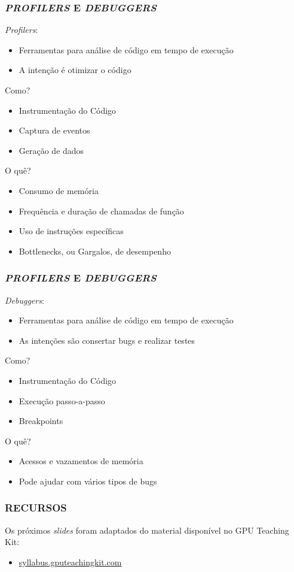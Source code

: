 \documentclass[10pt, compress]{beamer}
\begin{document}
\begin{frame}
    \frametitle{\textit{PROFILERS} E \textit{DEBUGGERS}}
    \textit{Profilers}:
    \begin{itemize}
        \item Ferramentas para análise de código \alert{em tempo de execução}
        \item A intenção é \alert{otimizar o código}
    \end{itemize}
    \pause
    Como?
    \begin{itemize}
        \item Instrumentação do Código
        \item Captura de eventos
        \item Geração de dados
    \end{itemize}
    \pause
    O quê?
    \begin{itemize}
        \item Consumo de memória
        \item Frequência e duração de chamadas de função
        \item Uso de instruções específicas
        \pause
        \item \alert{Bottlenecks}, ou \alert{Gargalos}, de desempenho
    \end{itemize}
\end{frame}

\begin{frame}
    \frametitle{\textit{PROFILERS} E \textit{DEBUGGERS}}
    \textit{Debuggers}:
    \begin{itemize}
        \item Ferramentas para análise de código \alert{em tempo de execução}
        \item As intenções são \alert{consertar bugs} e realizar \alert{testes}
    \end{itemize}
    \pause
    Como?
    \begin{itemize}
        \item Instrumentação do Código
        \item Execução passo-a-passo
        \item \alert{Breakpoints}
    \end{itemize}
    \pause
    O quê?
    \begin{itemize}
        \item Acessos e vazamentos de memória
        \item Pode ajudar com vários tipos de \alert{bugs} \smiley{}
    \end{itemize}
\end{frame}

\begin{frame}
    \frametitle{RECURSOS}
    Os próximos \emph{slides} foram adaptados do
    material disponível no \alert{GPU Teaching Kit}:
    \begin{itemize}
        \item \url{syllabus.gputeachingkit.com}
    \end{itemize}
\end{frame}


\maketitle
\end{document}
